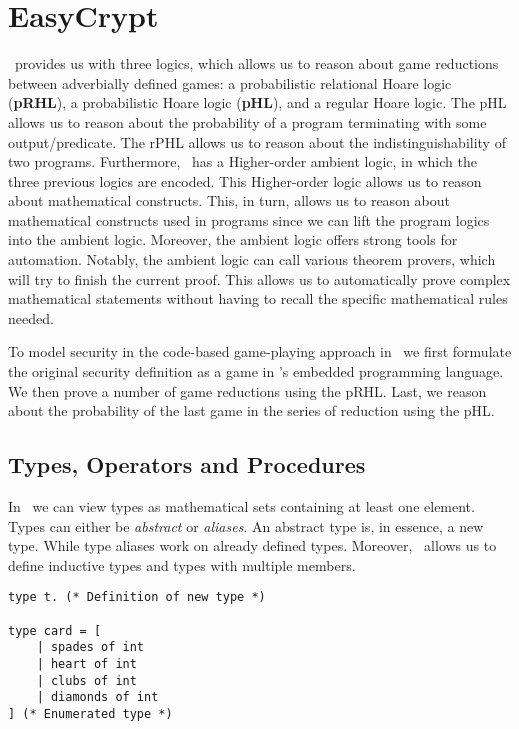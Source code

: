 \section{EasyCrypt}
\label{sec:label}
\easycrypt\ provides us with three logics, which allows us to reason about game
reductions between adverbially defined games: a probabilistic relational
Hoare logic (\textbf{pRHL}), a probabilistic Hoare logic (\textbf{pHL}), and a
regular Hoare logic.
The pHL allows us to reason about the probability of a program terminating with
some output/predicate.
The rPHL allows us to reason about the
indistinguishability of two programs.
Furthermore, \easycrypt\ has a Higher-order ambient logic, in which the three
previous logics are encoded.
This Higher-order logic allows us to reason about mathematical constructs. This,
in turn, allows us to reason about mathematical constructs used in programs
since we can lift the program logics into the ambient logic.
Moreover, the ambient logic offers strong tools for automation. Notably, the
ambient logic can call various theorem provers, which will try to finish the
current proof. This allows us to automatically prove complex mathematical
statements without having to recall the specific mathematical rules needed.

To model security in the code-based game-playing approach in \easycrypt\ we
first formulate the original security definition as a game in \easycrypt's embedded
programming language. We then prove a number of game reductions using the pRHL.
Last, we reason about the probability of the last game in the series of
reduction using the pHL.


\subsection{Types, Operators and Procedures}
\label{sec:ec_types_and_operators}
In \easycrypt\ we can view types as mathematical sets containing at least one
element. Types can either be \textit{abstract} or \textit{aliases}. An abstract
type is, in essence, a new type. While type aliases work on already defined
types.
Moreover, \easycrypt\ allows us to define inductive types and types with
multiple members.
\begin{lstlisting}
type t. (* Definition of new type *)

type card = [
    | spades of int
    | heart of int
    | clubs of int
    | diamonds of int
] (* Enumerated type *)
\end{lstlisting}

